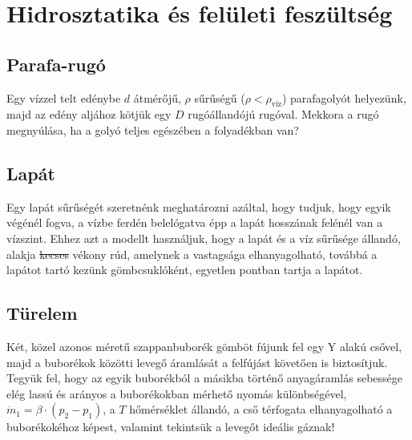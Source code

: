 \documentclass[12pt,a4paper]{scrartcl}
\begin{document}
\iffalse
\section{Hidrosztatika és felületi feszültség}
\subsection{Parafa-rugó}
Egy vízzel telt edénybe $d$ átmérőjű, $\rho$ sűrűségű ($\rho<\rho_{\text{víz}}$) parafagolyót helyezünk, majd az edény aljához kötjük egy $D$ rugóállandójú rugóval. Mekkora a rugó megnyúlása, ha a golyó teljes egészében a folyadékban van?


\subsection{Lapát}
Egy lapát sűrűségét szeretnénk meghatározni azáltal, hogy tudjuk, hogy egyik végénél fogva, a vízbe ferdén belelógatva épp a lapát hosszának felénél van a vízszint. Ehhez azt a modellt használjuk, hogy a lapát és a víz sűrűsége állandó, alakja \sout{kecses} vékony rúd, amelynek a vastagsága elhanyagolható, továbbá a lapátot tartó kezünk gömbcsuklóként, egyetlen pontban tartja a lapátot.

\subsection{Türelem}
Két, közel azonos méretű szappanbuborék gömböt fújunk fel egy Y alakú csővel, majd a buborékok közötti levegő áramlását a felfújást követően is biztosítjuk. Tegyük fel, hogy az egyik buborékból a másikba történő anyagáramlás sebessége elég lassú és arányos a buborékokban mérhető nyomás különbségével, ${\dot m_1} = \beta  \cdot \left( {{p_2} - {p_1}} \right)$, a $T$ hőmérséklet állandó, a cső térfogata elhanyagolható a buborékokéhoz képest, valamint tekintsük a levegőt ideális gáznak! 
\end{document}
